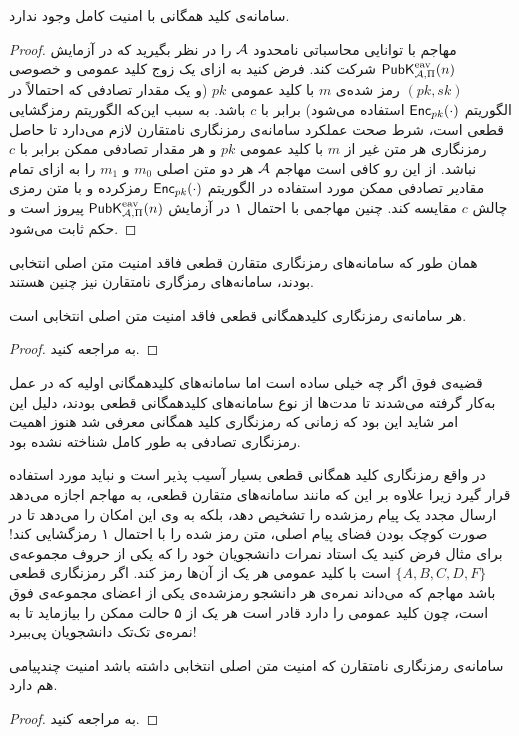 \begin{proposition}
سامانه‌ی کلید همگانی با امنیت کامل وجود ندارد.

\begin{proof}
	مهاجم با توانایی محاسباتی نامحدود
	$\mathcal{A}$
	 را در نظر بگیرید که در آزمایش 
	$\mathsf{PubK}_{\mathcal{A},\Pi}^{\textup{eav}}(n)$
	شرکت کند. فرض کنید به ازای یک زوج کلید عمومی و خصوصی 
	$(pk, sk)$
	رمز شده‌ی 
	$m$
	با کلید عمومی 
	$pk$
	(و یک مقدار تصادفی که احتمالاً در الگوریتم 
	$\mathsf{Enc}_{pk}(\cdot)$
	استفاده می‌شود) 	برابر با 
	$c$
	باشد. به سبب این‌که الگوریتم رمزگشایی قطعی است، 	شرط صحت عملکرد سامانه‌ی رمزنگاری نامتقارن لازم می‌دارد تا  حاصل رمزنگاری هر متن غیر از 
	$m$
	 با کلید عمومی 
	$pk$
	و هر مقدار تصادفی ممکن برابر با 
	$c$
	نباشد. از این رو کافی است مهاجم 
	$\mathcal{A}$
	هر دو متن اصلی 
	$m_{0}$
	و
	$m_{1}$
	را به ازای تمام مقادیر تصادفی ممکن مورد استفاده در الگوریتم 
	$\mathsf{Enc}_{pk}(\cdot)$
	رمزکرده و با متن رمزی چالش 
	$c$
	مقایسه کند. چنین مهاجمی با احتمال ۱ در آزمایش 
	$\mathsf{PubK}_{\mathcal{A},\Pi}^{\textup{eav}}(n)$
	پیروز است و حکم ثابت می‌شود. 
	
\end{proof}
\end{proposition}
همان طور که  سامانه‌های رمزنگاری متقارن قطعی فاقد امنیت متن اصلی انتخابی بودند، سامانه‌های رمزگاری نامتقارن نیز چنین هستند. 
\begin{theorem}
هر سامانه‌ی رمزنگاری کلیدهمگانی قطعی فاقد امنیت متن اصلی انتخابی است.
\begin{proof}
	به 
	\cite{katz2014introduction}
	مراجعه کنید.
\end{proof}
\end{theorem}
قضیه‌ی فوق اگر چه خیلی ساده است اما سامانه‌های کلیدهمگانی اولیه  که در عمل  به‌کار گرفته می‌شدند تا مدت‌ها از نوع سامانه‌های کلیدهمگانی قطعی بودند، دلیل این امر شاید این بود که زمانی که رمزنگاری کلید همگانی معرفی شد هنوز اهمیت رمزنگاری تصادفی به طور کامل شناخته نشده بود. 

در واقع رمزنگاری کلید همگانی قطعی بسیار آسیب پذیر است و نباید مورد استفاده قرار گیرد زیرا علاوه بر این که مانند سامانه‌های متقارن قطعی، به مهاجم اجازه می‌دهد ارسال مجدد یک پیام رمز‌شده را تشخیص دهد، بلکه به وی این امکان را می‌دهد تا در صورت کوچک بودن فضای پیام اصلی، متن رمز شده را با احتمال ۱ رمزگشایی کند! برای مثال فرض کنید یک استاد نمرات دانشجویان خود را  که یکی از حروف مجموعه‌ی 
$\{A, B, C, D, F\}$
است  با کلید عمومی هر یک از آن‌ها رمز کند. اگر رمزنگاری قطعی باشد مهاجم که می‌داند نمره‌ی هر دانشجو رمزشده‌ی یکی از اعضای مجموعه‌ی فوق است، چون کلید عمومی را دارد قادر است هر یک از ۵ حالت ممکن را بیازماید تا به نمره‌ی تک‌تک دانشجویان پی‌ببرد!
\begin{proposition}
	سامانه‌ی رمزنگاری نامتقارن که امنیت متن اصلی انتخابی داشته باشد امنیت چندپیامی هم دارد.
	\begin{proof}
به 
\cite{katz2014introduction}
مراجعه کنید.
	\end{proof}
\end{proposition}
